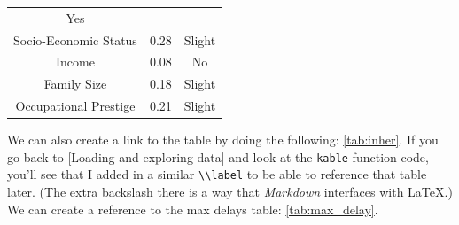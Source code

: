 \documentclass[12pt,twoside]{reedthesis}
\begin{document}
\begin{longtable}[]{@{}ccc@{}}
\begin{minipage}[t]{0.16\columnwidth}
  Yes\strut
  \end{minipage}\tabularnewline
  \begin{minipage}[t]{0.29\columnwidth}\centering\strut
  Socio-Economic Status\strut
  \end{minipage} & \begin{minipage}[t]{0.47\columnwidth}\centering\strut
  0.28\strut
  \end{minipage} & \begin{minipage}[t]{0.16\columnwidth}\centering\strut
  Slight\strut
  \end{minipage}\tabularnewline
  \begin{minipage}[t]{0.29\columnwidth}\centering\strut
  Income\strut
  \end{minipage} & \begin{minipage}[t]{0.47\columnwidth}\centering\strut
  0.08\strut
  \end{minipage} & \begin{minipage}[t]{0.16\columnwidth}\centering\strut
  No\strut
  \end{minipage}\tabularnewline
  \begin{minipage}[t]{0.29\columnwidth}\centering\strut
  Family Size\strut
  \end{minipage} & \begin{minipage}[t]{0.47\columnwidth}\centering\strut
  0.18\strut
  \end{minipage} & \begin{minipage}[t]{0.16\columnwidth}\centering\strut
  Slight\strut
  \end{minipage}\tabularnewline
  \begin{minipage}[t]{0.29\columnwidth}\centering\strut
  Occupational Prestige\strut
  \end{minipage} & \begin{minipage}[t]{0.47\columnwidth}\centering\strut
  0.21\strut
  \end{minipage} & \begin{minipage}[t]{0.16\columnwidth}\centering\strut
  Slight\strut
  \end{minipage}\tabularnewline
  \bottomrule
  \end{longtable}
  
  We can also create a link to the table by doing the following:
  \autoref{tab:inher}. If you go back to {[}Loading and exploring data{]}
  and look at the \texttt{kable} function code, you'll see that I added in
  a similar \texttt{\textbackslash{}\textbackslash{}label} to be able to
  reference that table later. (The extra backslash there is a way that
  \emph{Markdown} interfaces with \LaTeX.) We can create a reference to
  the max delays table: \autoref{tab:max_delay}.
  
\end{document}
